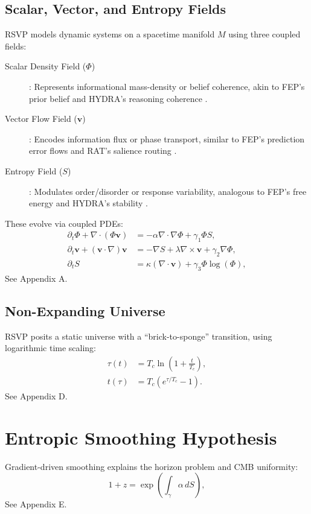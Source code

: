 \documentclass[12pt]{report}
\newcommand{\PhiRSVP}{\Phi}
\newcommand{\vRSVP}{\mathbf{v}}
\newcommand{\SRSVP}{S}
\begin{document}
\section{Scalar, Vector, and Entropy Fields}
RSVP models dynamic systems on a spacetime manifold \(M\) using three coupled fields:
\begin{description}
    \item[Scalar Density Field (\(\PhiRSVP\))]: Represents informational mass-density or belief coherence, akin to FEP’s prior belief \citep{Friston2010} and HYDRA’s reasoning coherence \citep{HYDRA2025}.
    \item[Vector Flow Field (\(\vRSVP\))]: Encodes information flux or phase transport, similar to FEP’s prediction error flows and RAT’s salience routing \citep{RAT2025}.
    \item[Entropy Field (\(\SRSVP\))]: Modulates order/disorder or response variability, analogous to FEP’s free energy and HYDRA’s stability \citep{Friston2010, HYDRA2025}.
\end{description}
These evolve via coupled PDEs:
\begin{align}
\partial_t \PhiRSVP + \nabla \cdot (\PhiRSVP \vRSVP) &= -\alpha \nabla \cdot \nabla \PhiRSVP + \gamma_1 \PhiRSVP \SRSVP, \label{eq:pde1} \\
\partial_t \vRSVP + (\vRSVP \cdot \nabla) \vRSVP &= -\nabla \SRSVP + \lambda \nabla \times \vRSVP + \gamma_2 \nabla \PhiRSVP, \label{eq:pde2} \\
\partial_t \SRSVP &= \kappa (\nabla \cdot \vRSVP) + \gamma_3 \PhiRSVP \log(\PhiRSVP), \label{eq:pde3}
\end{align}
See Appendix A.

\section{Non-Expanding Universe}
RSVP posits a static universe with a “brick-to-sponge” transition, using logarithmic time scaling:
\begin{align}
\tau(t) &= T_c \ln\left(1 + \frac{t}{T_c}\right), \label{eq:tau} \\
t(\tau) &= T_c \left(e^{\tau / T_c} - 1\right). \label{eq:t}
\end{align}
See Appendix D.

\chapter{Entropic Smoothing Hypothesis}
Gradient-driven smoothing explains the horizon problem and CMB uniformity:
\begin{equation}
1 + z = \exp\left(\int_\gamma \alpha \, d\SRSVP\right), \label{eq:redshift}
\end{equation}
See Appendix E.
\end{document}
